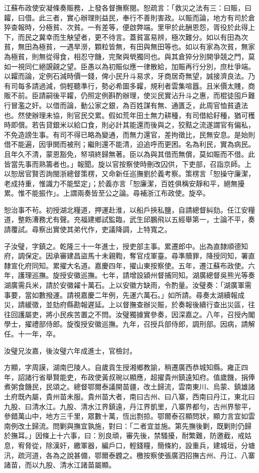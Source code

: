 \begin{pinyinscope}
江蘇布政使安凝條奏賑務，上發各督撫察閱。恕疏言：「救災之法有三：曰賑，曰糶，曰借。此三者，實心辦理則益民，奉行不善則害政。以賑而論，地方有司於倉猝查報時，分極貧、次貧。一有差等，便啟弊端。里甲於此酬恩怨，胥役於此得上下，而民之冀幸而生觖望者，更不待言。蓋貧富易辨，極次難分。如以有田為次貧，無田為極貧，一遇旱澇，顆粒皆無，有田與無田等也。如以有家為次貧，無家為極貧，則無從得食，相忍守饑，完聚與煢獨同也。與其倉猝分別開爭競之門，莫如一視同仁絕覬覦之望。臣愚以為初賑似應一律散給，加賑再行分別，庶杜爭端。以糶而論，定例石減時價一錢，俾小民升斗易求，牙商居奇無望，誠接濟良法。乃有司每多請過減，倘輕聽準行，勢必希圖多糶，規利者雲集喧囂。且米價太賤，商販不前。臣請嗣後平糶，仍照定例斟酌辦理，使災民實沾升斗之惠，而棍徒囤戶難行冒濫之奸。以借而論，動公家之銀，為百姓謀有無、通匱乏，此周官恤貧遺法也。然使辦理未協，則官民交累。假如荒年田土無力耕種，有司借給耔種，猶可穫時即償。若告貸銀米以給口食，則必計其能還而後與之，狡黠之流遂謂官有偏私，不免造謗生事。有司不得已略為變通，而無力還官，差拘徵比，民無安息。是始則借不能遍，因爭閧而被刑；繼則還不能清，迫追呼而更困。名為利民，實為病民。且年久不清，蒙恩豁免，帑項終歸無著。臣以為與其借而無償，莫如賑而不借。此皆當先事而熟籌者也。」報聞。旋以官按察使時刪改囚供，下吏部，召詣京師。上以恕居官賢否詢閩浙總督策楞，又命新任巡撫劉於義考察。策楞言「恕操守廉潔，老成持重，惟識力不能堅定」；於義亦言「恕廉潔，百姓俱稱安靜和平，絕無擾累。惟不能振作」。上謂兩奏皆至公之論。尋補浙江布政使。旋卒。

恕治事不茍。初授湖北糧道，押運赴淮，以船戶挾私鹽，自請總督糾劾。任江安糧道，整飭漕務尤有聲。充福建鄉試監臨，武生邱鵬飛以五經舉第一，士論不平，奏請覆試。尋察出實使其弟代作，吏議降調，上特寬之。

子汝璧，字鎮之。乾隆三十一年進士，授吏部主事。累遷郎中。出為直隸順德知府，調保定。因承審建昌盜馬十未親鞫，奪官戍軍臺。尋準贖罪，降授同知，署直隸宣化府同知。累擢大名道。嘉慶四年，擢山東按察使。五年，遷江蘇布政使。六年，護理巡撫。旋授安徽巡撫。七年，請增設潁州督捕同知。湖廣總督吳熊光等奏湖廣需兵米，請於安徽糴十萬石。上以安徽方缺雨，令酌量。汝璧奏：「湖廣軍需事要，當如數撥運。請視嘉慶二年例，先運六萬石。」如所請。尋奏太湖續報成災，請緩徵，並劾府縣勘報遲延。上以督撫查辦災賑，於奏報後續行查出災區，往往回護屬吏，將小民疾苦置之不問。汝璧獨據實參奏，因深嘉之。八年，召授內閣學士，擢禮部侍郎。旋復授安徽巡撫。九年，召授兵部侍郎，調刑部。因病，請解任。十一年，卒。

汝璧兄汝嘉，後汝璧六年成進士，官檢討。

方顯，字周謨，湖南巴陵人。自歲貢生授湘鄉教諭，稍遷廣西恭城知縣。雍正四年，詔諸行省舉賢能吏，布政使黃叔琬以顯應，超擢貴州鎮遠知府。值歲饑，捐俸煮粥食饑民，民頌之。總督鄂爾泰議開苗疆，改土歸流，雲南東川、烏蒙、鎮雄諸土府既內屬，貴州苗未服。貴州苗大者，南曰古州、曰八寨，西南曰丹江，東北曰九股、曰清水江。九股、清水江界鎮遠，丹江界凱里，八寨界都勻，古州界黎平，參錯萬山中，地方三千里，眾數十萬，恆出剽掠。鄂爾泰召顯問狀，顯力言宜如雲南例改土歸流。問剿與撫宜孰施，對曰：「二者宜並施。第先撫後剿，既剿則仍歸於撫耳。」因條上十六事，曰：別良頑，審先後，禁騷擾，耐繁難，防邀截，戒姑息，宥脅從，除漢奸，繳軍器，編戶口，輕錢糧，簡條約，設重兵，建城垣，分塘汛，疏河道，各為之說甚備，鄂爾泰韙之。檄按察使張廣泗招撫古州、丹江、八寨諸苗，而以九股、清水江諸苗屬顯。


\end{pinyinscope}
